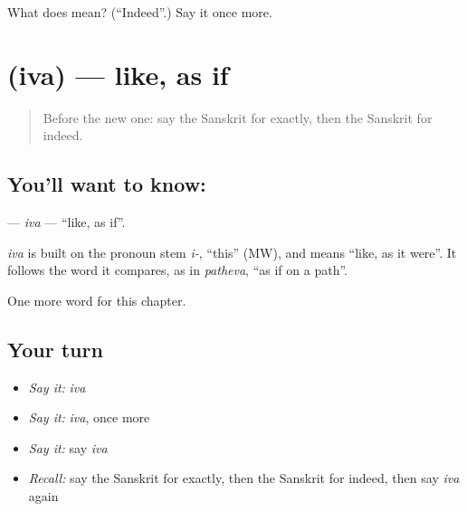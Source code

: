 \begin{tcolorbox}[breakable,colback=teal!4,colframe=teal!35!black,title={Before you move on}]
What does  mean? (\textquotedblleft{}Indeed\textquotedblright{}.) Say it once more.
\end{tcolorbox}
\section[\texorpdfstring{\sk{इव} (iva)}{इव (iva)}]{ (iva) — like, as if}

\label{lesson:SA-C214-iva}



\begin{quote}
Before the new one: say the Sanskrit for exactly, then the Sanskrit for indeed.
\end{quote}

\subsection*{You'll want to know: }
\textbf{} — \emph{iva} — \textquotedblleft{}like, as if\textquotedblright{}.

\begin{cousinweb}
\emph{iva} is built on the pronoun stem \emph{i-}, \textquotedblleft{}this\textquotedblright{} (MW), and means \textquotedblleft{}like, as it were\textquotedblright{}. It follows the word it compares, as in \emph{patheva}, \textquotedblleft{}as if on a path\textquotedblright{}.
\end{cousinweb}

\begin{grammarlens}[title={What you've built}]
One more word for this chapter.
\end{grammarlens}

\subsection*{Your turn}
\begin{itemize}
\raggedright
  \item \emph{Say it:} \emph{iva}
  \item \emph{Say it:} \emph{iva}, once more
  \item \emph{Say it:} say \emph{iva}
  \item \emph{Recall:} say the Sanskrit for exactly, then the Sanskrit for indeed, then say \emph{iva} again
\end{itemize}

